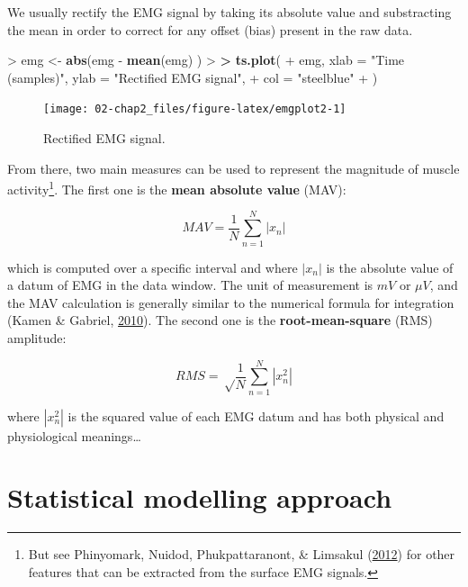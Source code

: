 \documentclass[a4paper,12pt,twoside,openright,oldfontcommands]{memoir}
\newenvironment{Shaded}{}{}
\newcommand{\KeywordTok}[1]{\textcolor[rgb]{0.00,0.44,0.13}{\textbf{#1}}}
\newcommand{\DataTypeTok}[1]{\textcolor[rgb]{0.56,0.13,0.00}{#1}}
\newcommand{\StringTok}[1]{\textcolor[rgb]{0.25,0.44,0.63}{#1}}
\newcommand{\OperatorTok}[1]{\textcolor[rgb]{0.40,0.40,0.40}{#1}}
\newcommand{\ErrorTok}[1]{\textcolor[rgb]{1.00,0.00,0.00}{\textbf{#1}}}
\newcommand{\NormalTok}[1]{#1}
\let\rmarkdownfootnote\footnote%
\def\footnote{\protect\rmarkdownfootnote}
\begin{document}
We usually rectify the EMG signal by taking its absolute value and
substracting the mean in order to correct for any offset (bias) present
in the raw data.

\begin{Shaded}
\begin{Highlighting}[]
\OperatorTok{>}\StringTok{ }\NormalTok{emg <-}\StringTok{ }\KeywordTok{abs}\NormalTok{(emg }\OperatorTok{-}\StringTok{ }\KeywordTok{mean}\NormalTok{(emg) )}
\OperatorTok{>}\StringTok{ }
\ErrorTok{>}\StringTok{ }\KeywordTok{ts.plot}\NormalTok{(}
\OperatorTok{+}\StringTok{   }\NormalTok{emg, }\DataTypeTok{xlab =} \StringTok{"Time (samples)"}\NormalTok{, }\DataTypeTok{ylab =} \StringTok{"Rectified EMG signal"}\NormalTok{,}
\OperatorTok{+}\StringTok{   }\DataTypeTok{col =} \StringTok{"steelblue"}
\OperatorTok{+}\StringTok{   }\NormalTok{)}
\end{Highlighting}
\end{Shaded}

\begin{figure}[H]

{\centering \texttt{[image: 02-chap2\_files/figure-latex/emgplot2-1]} 

}

\caption{Rectified EMG signal.}\label{fig:emgplot2}
\end{figure}

From there, two main measures can be used to represent the magnitude of
muscle activity\footnote{But see Phinyomark, Nuidod, Phukpattaranont, \&
  Limsakul (\protect\hyperlink{ref-phinyomark_feature_2012}{2012}) for
  other features that can be extracted from the surface EMG signals.}.
The first one is the \textbf{mean absolute value} (MAV):

\[MAV = \frac{1}{N} \sum_{n=1}^{N} | x_{n} |\]

which is computed over a specific interval and where \(|x_{n}|\) is the
absolute value of a datum of EMG in the data window. The unit of
measurement is \(mV\) or \(\mu V\), and the MAV calculation is generally
similar to the numerical formula for integration (Kamen \& Gabriel,
\protect\hyperlink{ref-kamen_essentials_2010}{2010}). The second one is
the \textbf{root-mean-square} (RMS) amplitude:

\[RMS = \sqrt \frac{1}{N} \sum_{n=1}^{N} | x^{2}_{n} |\]

where \(| x^{2}_{n} |\) is the squared value of each EMG datum and has
both physical and physiological meanings\ldots{}

\section{Statistical modelling
approach}\label{statistical-modelling-approach}
\end{document}
